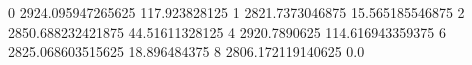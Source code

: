 0 2924.095947265625 117.923828125
1 2821.7373046875 15.565185546875
2 2850.688232421875 44.51611328125
4 2920.7890625 114.616943359375
6 2825.068603515625 18.896484375
8 2806.172119140625 0.0
